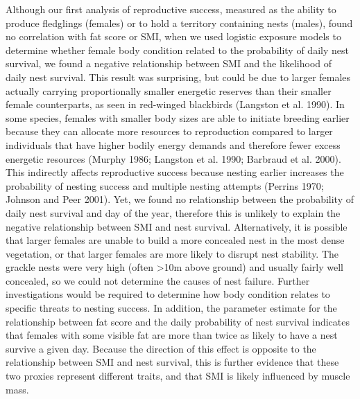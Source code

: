 \documentclass[
]{article}
\begin{document}
Although our first analysis of reproductive success, measured as the
ability to produce fledglings (females) or to hold a territory
containing nests (males), found no correlation with fat score or SMI,
when we used logistic exposure models to determine whether female body
condition related to the probability of daily nest survival, we found a
negative relationship between SMI and the likelihood of daily nest
survival. This result was surprising, but could be due to larger females
actually carrying proportionally smaller energetic reserves than their
smaller female counterparts, as seen in red-winged blackbirds (Langston
et al. 1990). In some species, females with smaller body sizes are able
to initiate breeding earlier because they can allocate more resources to
reproduction compared to larger individuals that have higher bodily
energy demands and therefore fewer excess energetic resources (Murphy
1986; Langston et al. 1990; Barbraud et al. 2000). This indirectly
affects reproductive success because nesting earlier increases the
probability of nesting success and multiple nesting attempts (Perrins
1970; Johnson and Peer 2001). Yet, we found no relationship between the
probability of daily nest survival and day of the year, therefore this
is unlikely to explain the negative relationship between SMI and nest
survival. Alternatively, it is possible that larger females are unable
to build a more concealed nest in the most dense vegetation, or that
larger females are more likely to disrupt nest stability. The grackle
nests were very high (often \textgreater10m above ground) and usually
fairly well concealed, so we could not determine the causes of nest
failure. Further investigations would be required to determine how body
condition relates to specific threats to nesting success. In addition,
the parameter estimate for the relationship between fat score and the
daily probability of nest survival indicates that females with some
visible fat are more than twice as likely to have a nest survive a given
day. Because the direction of this effect is opposite to the
relationship between SMI and nest survival, this is further evidence
that these two proxies represent different traits, and that SMI is
likely influenced by muscle mass.
\end{document}
